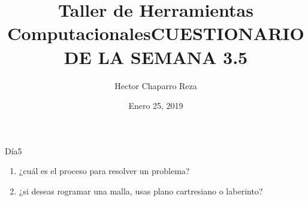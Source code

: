 \documentclass[letterpaper, 12pt, oneside]{article}
\title{\Huge{Taller de Herramientas Computacionales}}
\author{Hector Chaparro Reza}
\date{Enero 25, 2019}
\begin{document}
	\title{\Huge{CUESTIONARIO DE LA SEMANA 3.5}}	
	Día5
	\begin{enumerate}
		\item ¿cuál es el proceso para resolver un problema?
		\item ¿si deseas rogramar una malla, usas plano cartresiano o laberinto?
	\end{enumerate}
\end{document}
